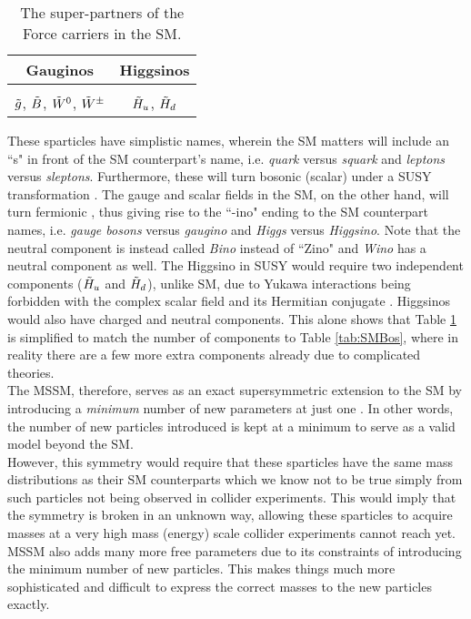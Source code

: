 \begin{table}[htbp]
    \centering
    \begin{tabular}{||c|c||}
    \hline 
       Gauginos  & Higgsinos \\
       \hline
        & \\[-2.5ex]
      $\Tilde{g}$, $\Tilde{B}$, $\Tilde{W}^0$, $\Tilde{W}^\pm$ & $\Tilde{H}_u$,  $\Tilde{H}_d$ \\
     \hline
    \end{tabular}
    \caption{The super-partners of the Force carriers in the SM.}
    \label{tab:SUSYinos}
\end{table}

These sparticles have simplistic names, wherein the SM matters will include an ``s" in front of the SM counterpart's name, i.e. \textit{quark} versus \textit{squark} and \textit{leptons} versus \textit{sleptons}. Furthermore, these will turn bosonic (scalar) under a SUSY transformation \cite{martin1997supersymmetry}. The gauge and scalar fields in the SM, on the other hand, will turn fermionic \cite{martin1997supersymmetry}, thus giving rise to the ``-ino" ending to the SM counterpart names, i.e. \textit{gauge bosons} versus \textit{gaugino} and \textit{Higgs} versus \textit{Higgsino}. Note that the neutral component is instead called \textit{Bino} instead of ``Zino" and \textit{Wino} has a neutral component as well.  The Higgsino in SUSY would require two independent components ($\Tilde{H}_u$ and $ \Tilde{H}_d $), unlike SM, due to Yukawa interactions being forbidden with the complex scalar field and its Hermitian conjugate \cite{aitchison2007supersymmetry}. Higgsinos would also have charged and neutral components. This alone shows that Table \ref{tab:SUSYinos} is simplified to match the number of components to Table \ref{tab:SMBos}, where in reality there are a few more extra components already due to complicated theories. \\

The MSSM, therefore, serves as an exact supersymmetric extension to the SM by introducing a \textit{minimum} number of new parameters at just one \cite{aitchison2007supersymmetry}. In other words, the number of new particles introduced is kept at a minimum to serve as a valid model beyond the SM. \\


However, this symmetry would require that these sparticles have the same mass distributions as their SM counterparts which we know not to be true simply from such particles not being observed in collider experiments. This would imply that the symmetry is broken in an unknown way, allowing these sparticles to acquire masses at a very high mass (energy) scale collider experiments cannot reach yet. MSSM also adds many more free parameters due to its constraints of introducing the minimum number of new particles. This makes things much more sophisticated and difficult to express the correct masses to the new particles exactly. \\

